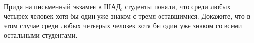 \documentclass{article}
\begin{document}
Придя на письменный экзамен в ШАД, студенты поняли, что среди любых четырех человек хотя бы один уже знаком с тремя оставшимися.
Докажите, что в этом случае среди любых четверых человек хотя бы один уже знаком со всеми остальными студентами.
\end{document}
